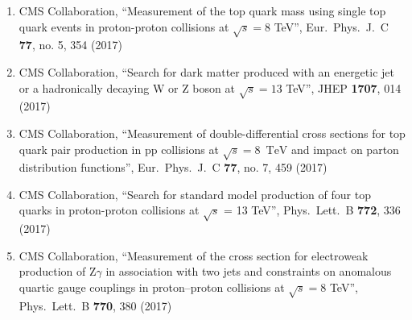 \begin{enumerate}
\item CMS Collaboration, ``Measurement of the top quark mass using single top quark events in proton-proton collisions at $\sqrt{s}= 8$  TeV'', Eur.\ Phys.\ J.\ C {\bf 77}, no. 5, 354 (2017)

\item CMS Collaboration, ``Search for dark matter produced with an energetic jet or a hadronically decaying W or Z boson at $ \sqrt{s}=13 $ TeV'', JHEP {\bf 1707}, 014 (2017)

\item CMS Collaboration, ``Measurement of double-differential cross sections for top quark pair production in pp collisions at $\sqrt{s} = 8$ $\,\text {TeV}$ and impact on parton distribution functions'', Eur.\ Phys.\ J.\ C {\bf 77}, no. 7, 459 (2017)

\item CMS Collaboration, ``Search for standard model production of four top quarks in proton-proton collisions at $\sqrt{s}$ = 13 TeV'', Phys.\ Lett.\ B {\bf 772}, 336 (2017)

\item CMS Collaboration, ``Measurement of the cross section for electroweak production of Z$\gamma$ in association with two jets and constraints on anomalous quartic gauge couplings in proton–proton collisions at $\sqrt{s} = 8$ TeV'', Phys.\ Lett.\ B {\bf 770}, 380 (2017)


\end{enumerate}
